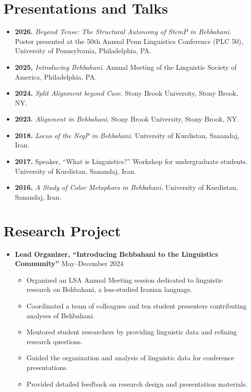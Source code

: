 \documentclass[a4paper,10pt]{article}
\begin{document}
\section*{\textbf{Presentations and Talks}}
\begin{itemize}[leftmargin=0.5cm]

\item \textbf{2026.} \textit{Beyond Tense: The Structural Autonomy of StemP in Behbahani}. 
Poster presented at the 50th Annual Penn Linguistics Conference (PLC 50), 
University of Pennsylvania, Philadelphia, PA.

\item \textbf{2025.} \textit{Introducing Behbahani}. 
Annual Meeting of the Linguistic Society of America, Philadelphia, PA.

\item \textbf{2024.} \textit{Split Alignment beyond Case}. 
Stony Brook University, Stony Brook, NY.

\item \textbf{2023.} \textit{Alignment in Behbahani}. 
Stony Brook University, Stony Brook, NY.

\item \textbf{2018.} \textit{Locus of the NegP in Behbahani}. 
University of Kurdistan, Sanandaj, Iran.

\item \textbf{2017.} Speaker, “What is Linguistics?” Workshop for undergraduate students. 
University of Kurdistan, Sanandaj, Iran.

\item \textbf{2016.} \textit{A Study of Color Metaphors in Behbahani}. 
University of Kurdistan, Sanandaj, Iran.

\end{itemize}
\section*{Research Project}
\begin{itemize}
\item \textbf{Lead Organizer, ``Introducing Behbahani to the Linguistics Community''} \hfill May–December 2024

\begin{itemize}[leftmargin=0.5cm]
\item Organized an LSA Annual Meeting session dedicated to linguistic research on Behbahani, a less-studied Iranian language.
\item Coordinated a team of colleagues and ten student presenters contributing analyses of Behbahani.
\item Mentored student researchers by providing linguistic data and refining research questions.
\item Guided the organization and analysis of linguistic data for conference presentations.
\item Provided detailed feedback on research design and presentation materials.
\end{itemize}

\end{itemize}
\end{document}
